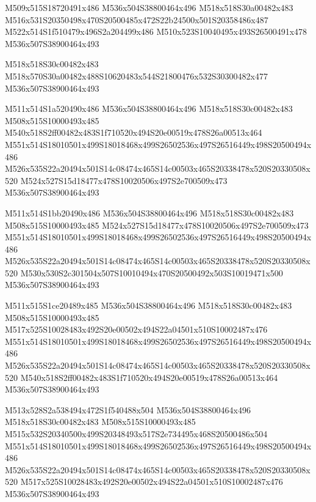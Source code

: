\documentclass{article}
\begin{document}
\begin{multicols}{5}
\begin{center}

M509x515S18720491x486 %
M536x504S38800464x496 %
M518x518S30a00482x483 %
M516x531S20350498x470S20500485x472S22b24500x501S20358486x487 %
M522x514S1f510479x496S2a204499x486 %
M510x523S10040495x493S26500491x478 %
M536x507S38900464x493 %

M518x518S30c00482x483 %
M518x570S30a00482x488S10620483x544S21800476x532S30300482x477 %
M536x507S38900464x493 %
\vfil
\columnbreak

M511x514S1a520490x486 %
M536x504S38800464x496 %
M518x518S30c00482x483 %
M508x515S10000493x485 %
M540x518S2ff00482x483S1f710520x494S20e00519x478S26a00513x464 %
M551x514S18010501x499S18018468x499S26502536x497S26516449x498S20500494x486 %
M526x535S22a20494x501S14c08474x465S14c00503x465S20338478x520S20330508x520 %
M524x527S15d18477x478S10020506x497S2e700509x473 %
M536x507S38900464x493 %
\vfil
\columnbreak

M511x514S1bb20490x486 %
M536x504S38800464x496 %
M518x518S30c00482x483 %
M508x515S10000493x485 %
M524x527S15d18477x478S10020506x497S2e700509x473 %
M551x514S18010501x499S18018468x499S26502536x497S26516449x498S20500494x486 %
M526x535S22a20494x501S14c08474x465S14c00503x465S20338478x520S20330508x520 %
M530x530S2c301504x507S10010494x470S20500492x503S10019471x500 %
M536x507S38900464x493 %
\vfil
\columnbreak

M511x515S1ce20489x485 %
M536x504S38800464x496 %
M518x518S30c00482x483 %
M508x515S10000493x485 %
M517x525S10028483x492S20e00502x494S22a04501x510S10002487x476 %
M551x514S18010501x499S18018468x499S26502536x497S26516449x498S20500494x486 %
M526x535S22a20494x501S14c08474x465S14c00503x465S20338478x520S20330508x520 %
M540x518S2ff00482x483S1f710520x494S20e00519x478S26a00513x464 %
M536x507S38900464x493 %
\vfil
\columnbreak

M513x528S2a538494x472S1f540488x504 %
M536x504S38800464x496 %
M518x518S30c00482x483 %
M508x515S10000493x485 %
M515x532S20340500x499S20348493x517S2e734495x468S20500486x504 %
M551x514S18010501x499S18018468x499S26502536x497S26516449x498S20500494x486 %
M526x535S22a20494x501S14c08474x465S14c00503x465S20338478x520S20330508x520 %
M517x525S10028483x492S20e00502x494S22a04501x510S10002487x476 %
M536x507S38900464x493 %
\vfil

\end{center}
\end{multicols}
\end{document}
